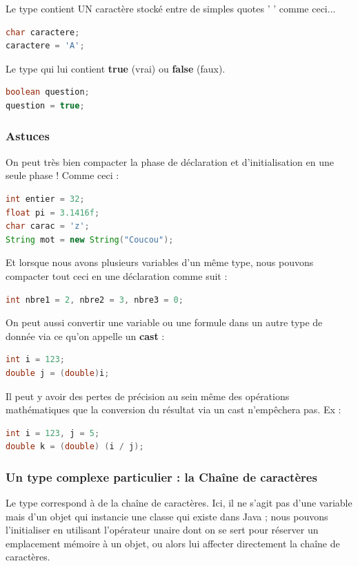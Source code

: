 \documentclass[a4paper,twoside]{article}
\begin{document}
\bigskip

Le type  contient UN caractère stocké entre de simples quotes ' ' comme ceci...
\begin{lstlisting}[language=java]
char caractere;
caractere = 'A';
\end{lstlisting}

\bigskip

Le type  qui lui contient \textbf{true} (vrai) ou \textbf{false} (faux).
\begin{lstlisting}[language=java]
boolean question;
question = true;
\end{lstlisting}

\subsubsection{Astuces}
On peut très bien compacter la phase de déclaration et d'initialisation en une seule phase ! Comme ceci :
\begin{lstlisting}[language=java]
int entier = 32;
float pi = 3.1416f;
char carac = 'z';
String mot = new String("Coucou");
\end{lstlisting}

Et lorsque nous avons plusieurs variables d'un même type, nous pouvons compacter tout ceci en une déclaration comme suit :
\begin{lstlisting}[language=java]
int nbre1 = 2, nbre2 = 3, nbre3 = 0;
\end{lstlisting}

\bigskip

On peut aussi convertir une variable ou une formule dans un autre type de donnée via ce qu'on appelle un \textbf{cast} :
\begin{lstlisting}[language=java]
int i = 123;
double j = (double)i;
\end{lstlisting}

\begin{attention}
Il peut y avoir des pertes de précision au sein même des opérations mathématiques que la conversion du résultat via un cast n'empêchera pas. 
Ex :
\begin{lstlisting}[language=java]
int i = 123, j = 5;
double k = (double) (i / j);
\end{lstlisting}
\end{attention}

\subsubsection{Un type complexe particulier : la Chaîne de caractères}
Le type  correspond à de la chaîne de caractères.
Ici, il ne s'agit pas d'une variable mais d'un objet qui instancie une classe qui existe dans Java ; nous pouvons l'initialiser en utilisant l'opérateur unaire  dont on se sert pour réserver un emplacement mémoire à un objet, ou alors lui affecter directement la chaîne de caractères.
\end{document}
